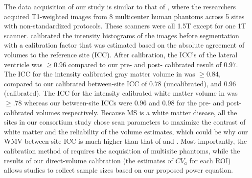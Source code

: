 The data acquisition of our study is similar to that of \cite{Schnack_2004}, where the researchers acquired T1-weighted images from 8 multicenter human phantoms across 5 sites with non-standardized protocols. These scanners were all 1.5T except for one 1T scanner. \cite{Schnack_2004} calibrated the intensity histograms of the images before segmentation with a calibration factor that was estimated based on the absolute agreement of volumes to the reference site (ICC). After calibration, the ICC's of the lateral ventricle was $\geq 0.96$ compared to our pre- and post- calibrated result of $0.97$. The ICC for the intensity calibrated gray matter volume in \cite{Schnack_2004} was $\geq 0.84$, compared to our calibrated between-site ICC of $0.78$ (uncalibrated), and $0.96$ (calibrated). The ICC for the intensity calibrated  white matter volume in \cite{Schnack_2004} was $\geq .78$ whereas our between-site ICCs were $0.96$ and $0.98$ for the pre- and post- calibrated volumes respectively. Because MS is a white matter disease, all the sites in our consortium study chose scan parameters to maximize the contrast of white matter and the reliability of the volume estimates, which could be why our WMV between-site ICC is much higher than that of \cite{Schnack_2004} and \cite{cannon2014}. Most importantly, the calibration method of \cite{Schnack_2004} requires the acquisition of multisite phantoms, while the results of our direct-volume calibration (the estimates of $CV_a$ for each ROI) allows studies to collect sample sizes based on our  proposed power equation. 